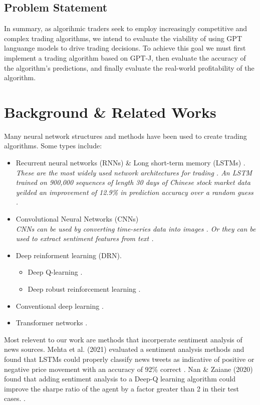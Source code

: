 \documentclass[conference]{IEEEtran}
\begin{document}
\subsection{Problem Statement}
In summary, as algorihmic traders seek to employ increasingly competitive and complex trading algorithms, we intend to evaluate the viability of using GPT languange models to drive trading decisions. To achieve this goal we must first implement a trading algorithm based on GPT-J, then evaluate the accuracy of the algorithm's predictions, and finally evaluate the real-world profitability of the algorithm.

\section{Background \& Related Works}
Many neural network structures and methods have been used to create trading algorithms. Some types include: 
\begin{itemize}
    \item Recurrent neural networks (RNNs) \& Long short-term memory (LSTMs) \cite{Chen2017}\cite{Mehta2021}.
    \\\emph{These are the most widely used network architectures for trading \cite{Gu2020}. An LSTM trained on 900,000 sequences of length 30 days of Chinese stock market data yeilded an improvement of 12.9\% in prediction accuracy over a random guess \cite{Chen2015}.}
    \item Convolutional Neural Networks (CNNs) \cite{Gu2020}
    \\\emph{CNNs can be used by converting time-series data into images \cite{Sezer2018}. Or they can be used to extract sentiment features from text \cite{Shi2020}.}
    \item Deep reinforment learning (DRN).
    \begin{itemize}
        \item Deep Q-learning \cite{Wang2017} \cite{Nan2020}.
        \item Deep robust reinforcement learning \cite{Li2019}.
    \end{itemize}
    \item Conventional deep learning \cite{Day2016}.
    \item Transformer networks \cite{Schmitz2020}.
\end{itemize}

Most relevent to our work are methods that incorperate sentiment analysis of news sources. Mehta et al. (2021) evaluated a sentiment analysis methods and found that LSTMs could properly classify news tweets as indicative of positive or negative price movement with an accuracy of 92\% correct \cite{Mehta2021}. Nan \& Zaiane (2020) found that adding sentiment analysis to a Deep-Q learning algorithm could improve the sharpe ratio of the agent by a factor greater than 2 in their test cases. \cite{Nan2020}.
\end{document}
